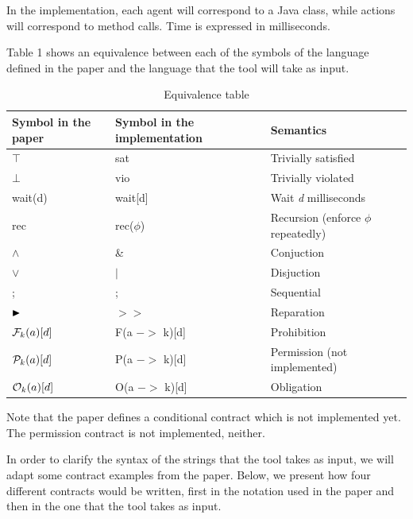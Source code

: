 \documentclass{article}
\begin{document}
In the implementation, each agent will correspond to a Java class, while actions will correspond to method calls. Time is expressed in milliseconds.

Table 1 shows an equivalence between each of the symbols of the language defined in the paper and the language that the tool will take as input.

\clearpage

\begin{table}[hp]
\centering
\caption{Equivalence table}
\label{my-label}
\begin{tabular}{|l|l|l|}
 Symbol in the paper & Symbol in the implementation & Semantics \\ \hline
 $\top$ & sat & Trivially satisfied                                    \\
 $\bot$ & vio & Trivially violated                                    \\
 wait(d) & wait[d] & Wait \textit{d} milliseconds                                   \\
 rec & rec($\phi$) & Recursion (enforce $\phi$ repeatedly)        \\
 $\wedge$ & \& & Conjuction                                     \\
 $\vee$ & $|$  & Disjuction                                     \\
; & ; & Sequential                                      \\
  $\blacktriangleright$ & $>>$ & Reparation            \\
  ${\mathcal{F}_{k}(a)}[d]$  & F(a $->$ k){[}d{]} & Prohibition \\
  ${\mathcal{P}_{k}(a)}[d]$  & P(a $->$ k){[}d{]} & Permission (not implemented) \\
  ${\mathcal{O}_{k}(a)}[d]$  & O(a $->$ k){[}d{]} & Obligation \\
                                         
\end{tabular}
\end{table}

Note that the paper defines a conditional contract which is not implemented yet. The permission contract is not implemented, neither.

In order to clarify the syntax of the strings that the tool takes as input, we will adapt some contract examples from the paper. Below, we present how four different contracts would be written, first in the notation used in the paper and then in the one that the tool takes as input. \\
\end{document}

